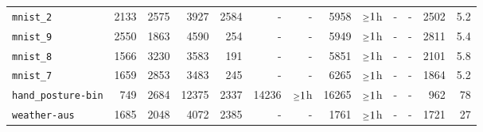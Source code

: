 \begin{tabular}{lrrrrrrrrrrrr}
\texttt{mnist\_2} & 2133 & 2575 & 3927 & 2584 & - & - & 5958 & $\mathsmaller{\geq}1$h & - & - & 2502 & 5.2\\
\texttt{mnist\_9} & 2550 & 1863 & 4590 & 254 & - & - & 5949 & $\mathsmaller{\geq}1$h & - & - & 2811 & 5.4\\
\texttt{mnist\_8} & 1566 & 3230 & 3583 & 191 & - & - & 5851 & $\mathsmaller{\geq}1$h & - & - & 2101 & 5.8\\
\texttt{mnist\_7} & 1659 & 2853 & 3483 & 245 & - & - & 6265 & $\mathsmaller{\geq}1$h & - & - & 1864 & 5.2\\
\texttt{hand\_posture-bin} & 749 & 2684 & 12375 & 2337 & 14236 & $\mathsmaller{\geq}1$h & 16265 & $\mathsmaller{\geq}1$h & - & - & 962 & 78\\
\texttt{weather-aus} & 1685 & 2048 & 4072 & 2385 & - & - & 1761 & $\mathsmaller{\geq}1$h & - & - & 1721 & 27\\
\bottomrule
\end{tabular}
